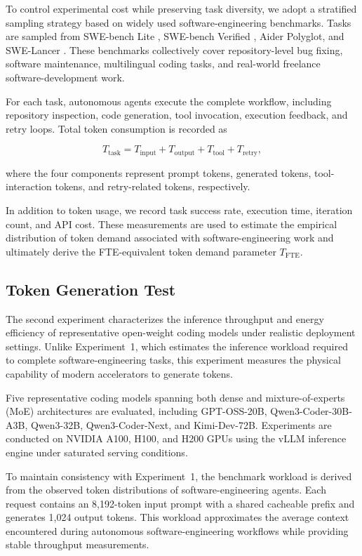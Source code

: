 \documentclass{article}
\begin{document}
To control experimental cost while preserving task diversity, we adopt a stratified sampling strategy based on widely used software-engineering benchmarks. Tasks are sampled from SWE-bench Lite \citep{jimenez2024swebench}, SWE-bench Verified \citep{swebench2026}, Aider Polyglot, and SWE-Lancer \citep{miserendino2025swelancer}. These benchmarks collectively cover repository-level bug fixing, software maintenance, multilingual coding tasks, and real-world freelance software-development work.

For each task, autonomous agents execute the complete workflow, including repository inspection, code generation, tool invocation, execution feedback, and retry loops. Total token consumption is recorded as

\begin{equation}
T_{\mathrm{task}}
=
T_{\mathrm{input}}
+
T_{\mathrm{output}}
+
T_{\mathrm{tool}}
+
T_{\mathrm{retry}},
\end{equation}

where the four components represent prompt tokens, generated tokens, tool-interaction tokens, and retry-related tokens, respectively.

In addition to token usage, we record task success rate, execution time, iteration count, and API cost. These measurements are used to estimate the empirical distribution of token demand associated with software-engineering work and ultimately derive the FTE-equivalent token demand parameter $T_{\mathrm{FTE}}$.

\subsection{Token Generation Test}

The second experiment characterizes the inference throughput and energy efficiency of representative open-weight coding models under realistic deployment settings. Unlike Experiment~1, which estimates the inference workload required to complete software-engineering tasks, this experiment measures the physical capability of modern accelerators to generate tokens.

Five representative coding models spanning both dense and mixture-of-experts (MoE) architectures are evaluated, including GPT-OSS-20B, Qwen3-Coder-30B-A3B, Qwen3-32B, Qwen3-Coder-Next, and Kimi-Dev-72B. Experiments are conducted on NVIDIA A100, H100, and H200 GPUs using the vLLM inference engine under saturated serving conditions.

To maintain consistency with Experiment~1, the benchmark workload is derived from the observed token distributions of software-engineering agents. Each request contains an 8,192-token input prompt with a shared cacheable prefix and generates 1,024 output tokens. This workload approximates the average context encountered during autonomous software-engineering workflows while providing stable throughput measurements.
\end{document}
